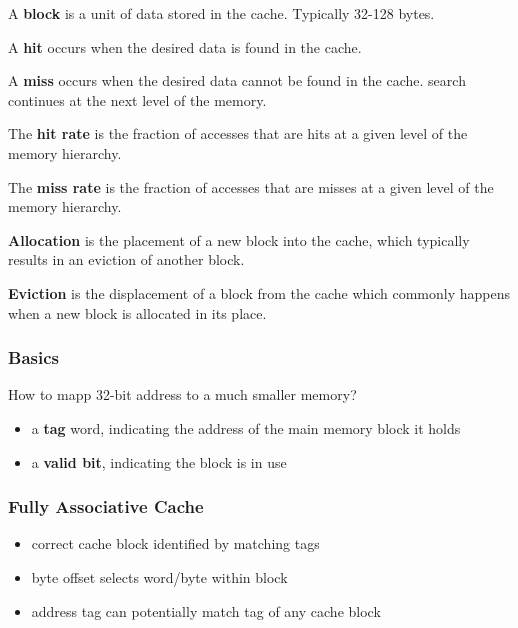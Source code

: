 \documentclass{article}
\begin{document}
\begin{definition}
	A \textbf{block} is a unit of data stored in the cache. Typically 32-128 bytes.
\end{definition}
\begin{definition}
	A \textbf{hit} occurs when the desired data is found in the cache.
\end{definition}
\begin{definition}
	A \textbf{miss} occurs when the desired data cannot be found in the cache.
	\Rightarrow search continues at the next level of the memory.
\end{definition}
\begin{definition}
	The \textbf{hit rate} is the fraction of accesses that are hits at a given level of the memory hierarchy.
\end{definition}
\begin{definition}
	The \textbf{miss rate} is the fraction of accesses that are misses at a given level of the memory hierarchy.
\end{definition}
\begin{definition}
	\textbf{Allocation} is the placement of a new block into the cache, which typically results in an eviction
	of another block.
\end{definition}
\begin{definition}
	\textbf{Eviction} is the displacement of a block from the cache which commonly happens when a new block is
	allocated in its place.
\end{definition}

\subsubsection{Basics}

How to mapp 32-bit address to a much smaller memory?
\begin{itemize}
	\item a \textbf{tag} word, indicating the address of the main memory block it holds
	\item a \textbf{valid bit}, indicating the block is in use
\end{itemize}

\subsubsection{Fully Associative Cache}

\begin{itemize}
	\item correct cache block identified by matching tags
	\item byte offset selects word/byte within block
	\item address tag can potentially match tag of any cache block
\end{itemize}
\end{document}
